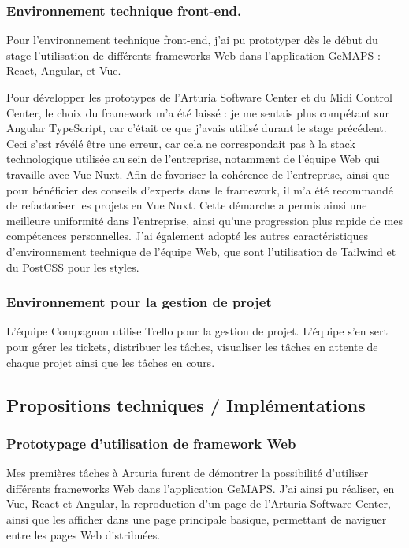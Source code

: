 \documentclass[francais]{rapportPFE}  %
\begin{document}
\subsubsection{Environnement technique front-end.}

Pour l'environnement technique front-end, j'ai pu prototyper dès le début du stage l'utilisation de différents frameworks Web dans l'application GeMAPS : React, Angular, et Vue.  

Pour développer les prototypes de l'Arturia Software Center et du Midi Control Center, le choix du framework m'a été laissé : je me sentais plus compétant sur Angular TypeScript, car c'était ce que j'avais utilisé durant le stage précédent. Ceci s'est révélé être une erreur, car cela ne correspondait pas à la stack technologique utilisée au sein de l'entreprise, notamment de l'équipe Web qui travaille avec Vue Nuxt. Afin de favoriser la cohérence de l'entreprise, ainsi que pour bénéficier des conseils d'experts dans le framework, il m'a été recommandé de refactoriser les projets en Vue Nuxt. Cette démarche a permis ainsi une meilleure uniformité dans l'entreprise, ainsi qu'une progression plus rapide de mes compétences personnelles. J'ai également adopté les autres caractéristiques d'environnement technique de l'équipe Web, que sont l'utilisation de Tailwind et du PostCSS pour les styles. 

\subsubsection{Environnement pour la gestion de projet}
L'équipe Compagnon utilise Trello pour la gestion de projet. L'équipe s'en sert pour gérer les tickets, distribuer les tâches, visualiser les tâches en attente de chaque projet ainsi que les tâches en cours.

\subsection{Propositions techniques / Implémentations}
\subsubsection{Prototypage d'utilisation de framework Web}
Mes premières tâches à Arturia furent de démontrer la possibilité d'utiliser différents frameworks Web dans l'application GeMAPS.
J'ai ainsi pu réaliser, en Vue, React et Angular, la reproduction d'un page de l'Arturia Software Center, ainsi que les afficher dans une page principale basique, permettant de naviguer entre les pages Web distribuées. 
\end{document}
